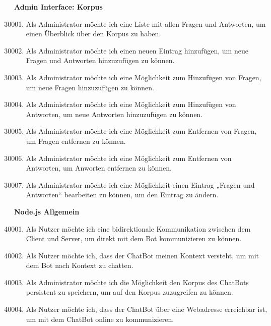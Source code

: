\textbf{Admin Interface: Korpus}
\begin{enumerate}[leftmargin=*,labelindent=40pt,label=u\arabic*.]
    \setcounter{enumi}{30000}
    \item Als Administrator möchte ich eine Liste mit allen Fragen und Antworten, um einen Überblick über den Korpus zu haben.
    \item Als Administrator möchte ich einen neuen Eintrag hinzufügen, um neue Fragen und Antworten hinzuzufügen zu können.
    \item Als Administrator möchte ich eine Möglichkeit zum Hinzufügen von Fragen, um neue Fragen hinzuzufügen zu können.
    \item Als Administrator möchte ich eine Möglichkeit zum Hinzufügen von Antworten, um neue Antworten hinzuzufügen zu können.
    \item Als Administrator möchte ich eine Möglichkeit zum Entfernen von Fragen, um Fragen entfernen zu können.
    \item Als Administrator möchte ich eine Möglichkeit zum Entfernen von Antworten, um Anworten entfernen zu können.
    \item Als Administrator möchte ich eine Möglichkeit einen Eintrag „Fragen und Antworten“ bearbeiten zu können, um den Eintrag zu ändern.
\end{enumerate}
\newpage
\textbf{Node.js Allgemein}
\begin{enumerate}[leftmargin=*,labelindent=40pt,label=u\arabic*.]
    \setcounter{enumi}{40000}
    \item Als Nutzer möchte ich eine bidirektionale Kommunikation zwischen dem Client und Server, um direkt mit dem Bot kommunizieren zu können.
    \item Als Nutzer möchte ich, dass der ChatBot meinen Kontext versteht, um mit dem Bot nach Kontext zu chatten.
    \item Als Administrator möchte ich die Möglichkeit den Korpus des ChatBots persistent zu speichern, um auf den Korpus zuzugreifen zu können.
    \item Als Nutzer möchte ich, dass der ChatBot über eine Webadresse erreichbar ist, um mit dem ChatBot online zu kommunizieren.
\end{enumerate}

